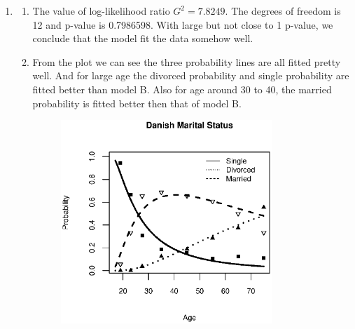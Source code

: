 \documentclass{article}
\begin{document}
\begin{enumerate}[leftmargin = 0 em, label = \arabic*., font = \bfseries]
\begin{enumerate}
\begin{enumerate}
		\end{enumerate}
\newpage
		\item 
		\begin{enumerate}
			\item The value of log-likelihood ratio $G^2 = 7.8249$. The degrees of freedom is 12 and p-value is 0.7986598. With large but not close to 1 p-value, we conclude that the model fit the data somehow well.
		\item From the plot we can see the three probability lines are all fitted pretty well. And for large age the divorced probability and single probability are fitted better than model B. Also for age around 30 to 40, the married probability is fitted better then that of model B.
						\begin{figure}[!htb]
					\centering
					\includegraphics[width = 0.8\textwidth]{2C.eps}
				\end{figure}

		\end{enumerate}


\end{enumerate}
\end{enumerate}
\end{document}
